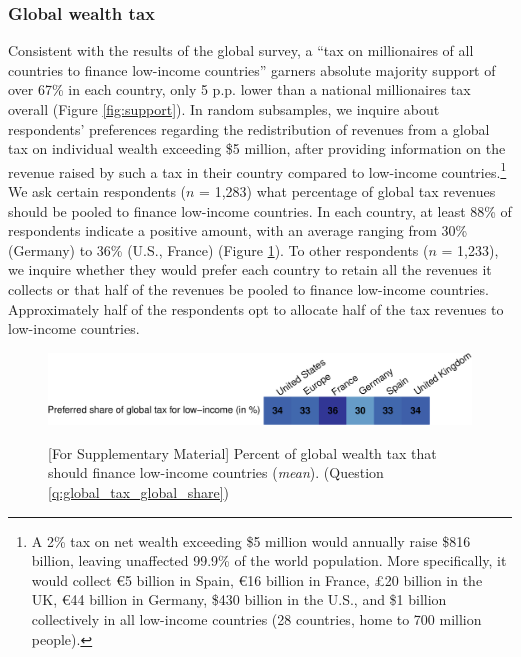

\subsubsection{Global wealth tax}\label{subsubsec:support_global_wealth_tax}

Consistent with the results of the global survey, a ``tax on millionaires of all countries to finance low-income countries'' garners absolute majority support of over 67\% in each country, only 5 p.p. lower than a national millionaires tax overall (Figure \ref{fig:support}). In random subsamples, we inquire about respondents' preferences regarding the redistribution of revenues from a global tax on individual wealth exceeding \$5 million, after providing information on the revenue raised by such a tax in their country compared to low-income countries.\footnote{A 2\% tax on net wealth exceeding \$5 million would annually raise \$816 billion, leaving unaffected 99.9\% of the world population. More specifically, it would collect \euro{}5 billion in Spain, \euro{}16 billion in France, £20 billion in the UK, \euro{}44 billion in Germany, \$430 billion in the U.S., and \$1 billion collectively in all low-income countries (28 countries, home to 700 million people).%
} We ask certain respondents ($n$ = 1,283) what percentage of global tax revenues should be pooled to finance low-income countries. In each country, at least 88\% of respondents indicate a positive amount, with an average ranging from 30\% (Germany) to 36\% (U.S., France) (Figure \ref{fig:global_share_mean}). To other respondents ($n$ = 1,233), we inquire whether they would prefer each country to retain all the revenues it collects or that half of the revenues be pooled to finance low-income countries. Approximately half of the respondents opt to allocate half of the tax revenues to low-income countries.


\begin{figure}
    \centering 
    \caption[Preferred share of wealth tax for low-income countries]{[For Supplementary Material] Percent of global wealth tax that should finance low-income countries (\textit{mean}). (Question \ref{q:global_tax_global_share})} %
    \includegraphics[width=1\textwidth]{../figures/country_comparison/global_tax_global_share_mean.pdf} \label{fig:global_share_mean}
\end{figure}


